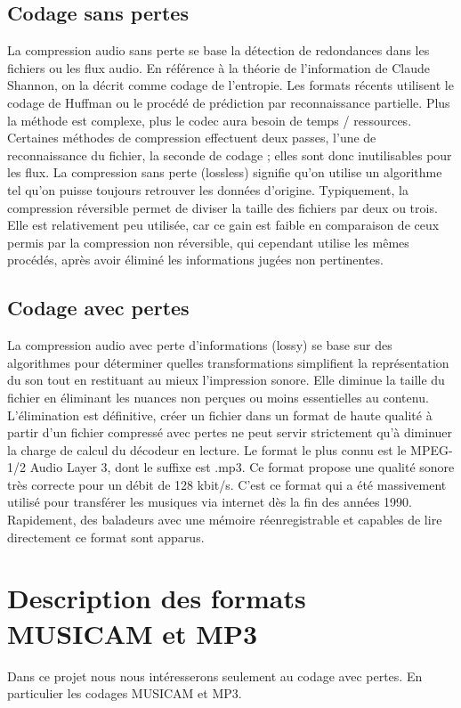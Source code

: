 \documentclass[a4paper,10pt, french]{article}
\begin{document}
  \subsection{Codage sans pertes}
  La compression audio sans perte se base la détection de redondances dans les fichiers ou les flux audio. En référence à la théorie de l'information de Claude Shannon, on la décrit comme codage de l'entropie. Les formats récents utilisent le codage de Huffman ou le procédé de prédiction par reconnaissance partielle. Plus la méthode est complexe, plus le codec aura besoin de temps / ressources. Certaines méthodes de compression effectuent deux passes, l'une de reconnaissance du fichier, la seconde de codage ; elles sont donc inutilisables pour les flux. La compression sans perte (lossless) signifie qu'on utilise un algorithme tel qu'on puisse toujours retrouver les données d'origine.
  Typiquement, la compression réversible permet de diviser la taille des fichiers par deux ou trois. Elle est relativement peu utilisée, car ce gain est faible en comparaison de ceux permis par la compression non réversible, qui cependant utilise les mêmes procédés, après avoir éliminé les informations jugées non pertinentes.
  \subsection{Codage avec pertes}
  La compression audio avec perte d'informations (lossy) se base sur des algorithmes pour déterminer quelles transformations simplifient la représentation du son tout en restituant au mieux l'impression sonore. Elle diminue la taille du fichier en éliminant les nuances non perçues ou moins essentielles au contenu. L'élimination est définitive, créer un fichier dans un format de haute qualité à partir d'un fichier compressé avec pertes ne peut servir strictement qu'à diminuer la charge de calcul du décodeur en lecture.
  Le format le plus connu est le MPEG-1/2 Audio Layer 3, dont le suffixe est .mp3. Ce format propose une qualité sonore très correcte pour un débit de 128 kbit/s. C'est ce format qui a été massivement utilisé pour transférer les musiques via internet dès la fin des années 1990. Rapidement, des baladeurs avec une mémoire réenregistrable et capables de lire directement ce format sont apparus.

\section{Description des formats MUSICAM et MP3}
  Dans ce projet nous nous intéresserons seulement au codage avec pertes. En particulier les codages MUSICAM et MP3.
\end{document}
